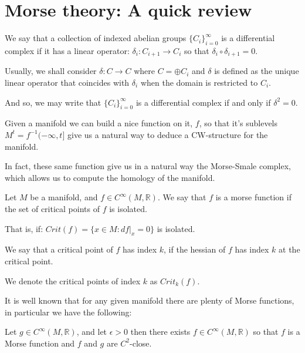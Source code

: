 \newcommand{\R}{\mathbb{R}}
\chapter{Morse theory: A quick review}


\begin{definition}
We say that a collection of indexed abelian groups
$\{C_i\}_{i=0}^{\infty}$ is a differential complex if
it has a linear operator:
$\delta_i: C_{i+1}\to C_i$
so that $\delta_i\circ\delta_{i+1}=0$.

Usually, we shall consider $\delta: C\to C$ where $C=\oplus C_i$
and $\delta$ is defined as the unique linear operator that coincides with $\delta_i$
when the domain is restricted to $C_i$.

And so, we may write that $\{C_i\}_{i=0}^{\infty}$ 
is a differential complex if and only if $\delta^2=0$.
\end{definition}

Given a manifold we can build a nice function on it, $f$,
so that it's sublevels $M^t=f^{-1}(-\infty,t]$ give us a natural way to 
deduce a CW-structure for the manifold.

In fact, these same function give us in a natural way the Morse-Smale complex,
which allows us to compute the homology of the manifold.

\begin{definition}

Let $M$ be a manifold, and $f\in C^\infty(M,\mathbb{R})$.
We say that $f$ is a morse function if the set of critical points
of $f$ is isolated. 

That is, if:
$
Crit(f)=\{x\in M: df\vert_x=0
\}
$
is isolated.

\end{definition}

We say that a critical point of $f$ has index $k$,
if the hessian of $f$ has index $k$ at the critical point.

We denote the critical points of index $k$ as $Crit_k(f)$.

It is well known that for any given manifold there are plenty of Morse functions,
in particular we have the following:


\begin{theorem}
\cite{mat1997}
Let $g\in C^\infty(M,\mathbb{R})$, and let $\epsilon>0$
then there exists $f\in C^\infty(M,\mathbb{R})$ so that $f$
is a Morse function and $f$ and $g$ are $C^2$-close.
\end{theorem}

